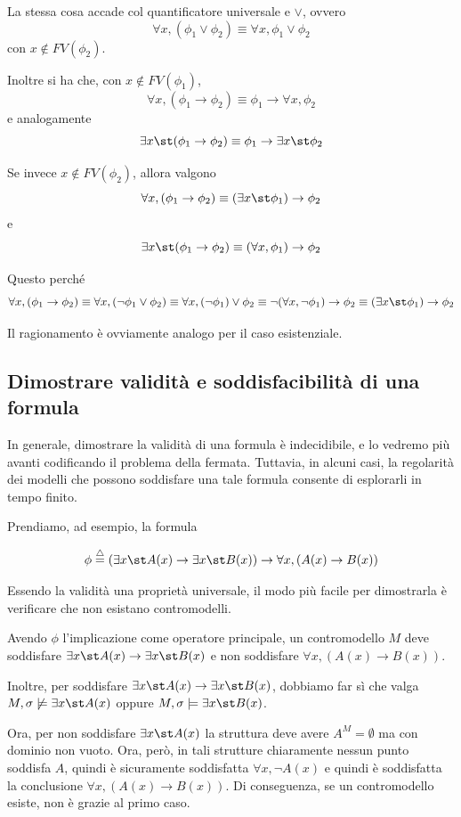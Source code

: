La stessa cosa accade col quantificatore universale e \(\lor\), ovvero
\[\forall x, (\phi_1 \lor \phi_2) \equiv \forall x, \phi_1 \lor \phi_2\]
con \(x \notin FV(\phi_2)\).

Inoltre si ha che, con \(x \notin FV(\phi_1)\),
\[\forall x, (\phi_1 \to \phi_2) \equiv \phi_1 \to \forall x, \phi_2\]
e analogamente
\[\exists x\st (\phi_1 \to \phi_2) \equiv \phi_1 \to \exists x\st \phi_2\]

Se invece \(x \notin FV(\phi_2)\), allora valgono
\[\forall x, (\phi_1 \to \phi_2) \equiv (\exists x\st \phi_1 )\to \phi_2\]
e
\[\exists x\st (\phi_1 \to \phi_2) \equiv (\forall x, \phi_1 )\to \phi_2\]

Questo perché 
\[\forall x, (\phi_1 \to \phi_2) \equiv \forall x, (\neg \phi_1 \lor \phi_2) \equiv \forall x, (\neg \phi_1 )\lor \phi_2 \equiv \neg (\forall x, \neg \phi_1) \to \phi_2 \equiv (\exists x\st \phi_1)\to \phi_2\]

Il ragionamento è ovviamente analogo per il caso esistenziale.

\subsection{Dimostrare validità e soddisfacibilità di una formula}
In generale, dimostrare la validità di una formula è indecidibile, e lo vedremo più avanti codificando il problema della fermata. Tuttavia, in alcuni casi, la regolarità dei modelli che possono soddisfare una tale formula consente di esplorarli in tempo finito.

Prendiamo, ad esempio, la formula

\[\phi \eqdef (\exists x\st A(x)\to \exists x\st B(x))\to \forall x, (A(x)\to B(x))\]

Essendo la validità una proprietà universale, il modo più facile per dimostrarla è verificare che non esistano contromodelli.

Avendo \(\phi\) l'implicazione come operatore principale, un contromodello \(M\) deve soddisfare \(\exists x\st A(x)\to \exists x\st B(x)\) e non soddisfare \(\forall x, (A(x)\to B(x))\).

Inoltre, per soddisfare \(\exists x\st A(x)\to \exists x\st B(x)\), dobbiamo far sì che valga \(M,\sigma\not\models \exists x\st A(x)\) oppure \(M,\sigma \models \exists x\st B(x)\). 

Ora, per non soddisfare \(\exists x\st A(x)\) la struttura deve avere \(A^M =\emptyset\) ma con dominio non vuoto. Ora, però, in tali strutture chiaramente nessun punto soddisfa \(A\), quindi è sicuramente soddisfatta \(\forall x, \neg A(x)\) e quindi è soddisfatta la conclusione \(\forall x, (A(x)\to B(x))\). 
Di conseguenza, se un contromodello esiste, non è grazie al primo caso.

